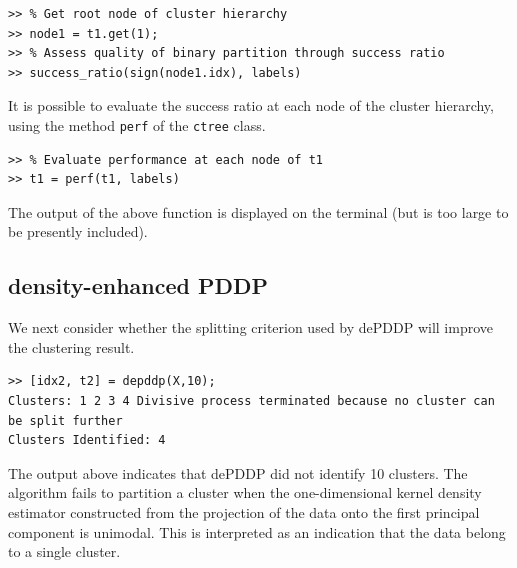 \documentclass{book}
\begin{document}
\begin{lstlisting}
>> % Get root node of cluster hierarchy
>> node1 = t1.get(1);
>> % Assess quality of binary partition through success ratio
>> success_ratio(sign(node1.idx), labels)
\end{lstlisting}



It is possible to evaluate the success ratio at each node of the cluster hierarchy,
using the method {\tt perf} of the {\tt ctree} class. 


\begin{lstlisting}
>> % Evaluate performance at each node of t1
>> t1 = perf(t1, labels)
\end{lstlisting}


\noindent
The output of the above function is displayed on the terminal (but is
too large to be presently included).

\subsection{density-enhanced PDDP}

We next consider whether the splitting criterion used by dePDDP will
improve the clustering result.



\begin{lstlisting}
>> [idx2, t2] = depddp(X,10);
Clusters: 1 2 3 4 Divisive process terminated because no cluster can be split further
Clusters Identified: 4
\end{lstlisting}


\noindent
%
The output above indicates that dePDDP did not identify 10 clusters. The
algorithm fails to partition a cluster when the one-dimensional kernel density
estimator constructed from the projection of the data onto the first principal
component is unimodal. This is interpreted as an indication that the data belong
to a single cluster.
\end{document}
